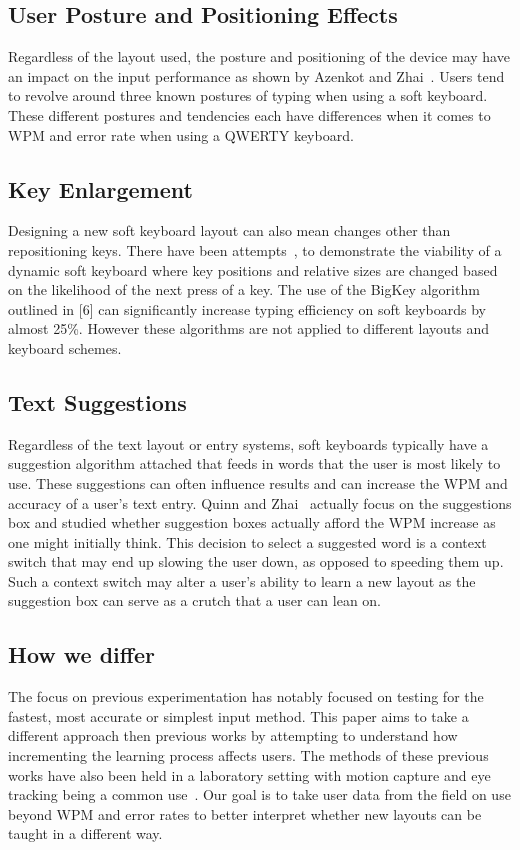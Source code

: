 \subsection{User Posture and Positioning Effects}
Regardless of the layout used, the posture and positioning of the device may have an impact on the input performance as shown by Azenkot and Zhai~\cite{Azenkot:2012:TBD:2371574.2371612}. Users tend to revolve around three known postures of typing when using a soft keyboard. These different postures and tendencies each have differences when it comes to WPM and error rate when using a QWERTY keyboard.


\subsection{Key Enlargement}
Designing a new soft keyboard layout can also mean changes other than repositioning keys. There have been attempts~\cite{Gunawardana:2010:UGK:1719970.1719986, AlFaraj2009}, to demonstrate the viability of a dynamic soft keyboard where key positions and relative sizes are changed based on the likelihood of the next press of a key. The use of the BigKey algorithm outlined in [6] can significantly increase typing efficiency on soft keyboards by almost 25\%. However these algorithms are not applied to different layouts and keyboard schemes.


\subsection{Text Suggestions}
Regardless of the text layout or entry systems, soft keyboards typically have a suggestion algorithm attached that feeds in words that the user is most likely to use. These suggestions can often influence results and can increase the WPM and accuracy of a user's text entry. Quinn and Zhai~\cite{Quinn:2016:CST:2858036.2858305} actually focus on the suggestions box and studied whether suggestion boxes actually afford the WPM increase as one might initially think. This decision to select a suggested word is a context switch that may end up slowing the user down, as opposed to speeding them up. Such a context switch may alter a user's ability to learn a new layout as the suggestion box can serve as a crutch that a user can lean on. 



\subsection{How we differ}
The focus on previous experimentation has notably focused on testing for the fastest, most accurate or simplest input method. This paper aims to take a different approach then previous works by attempting to understand how incrementing the learning process affects users. The methods of these previous works have also been held in a laboratory setting with motion capture and eye tracking being a common use~\cite{Azenkot:2012:TBD:2371574.2371612, Gunawardana:2010:UGK:1719970.1719986, AlFaraj2009, Quinn:2016:CST:2858036.2858305}. Our goal is to take user data from the field on use beyond WPM and error rates to better interpret whether new layouts can be taught in a different way.
